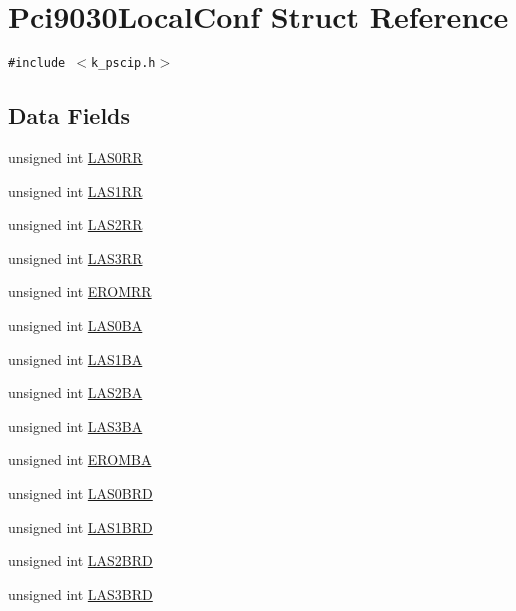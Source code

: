 \hypertarget{struct_pci9030_local_conf}{
\section{Pci9030LocalConf Struct Reference}
\label{struct_pci9030_local_conf}
}
{\tt \#include $<$k\_\-pscip.h$>$}

\subsection*{Data Fields}
\begin{CompactItemize}
\item 
unsigned int \hyperlink{struct_pci9030_local_conf_c27dcf44354ec5809d743275f64a403c}{LAS0RR}
\item 
unsigned int \hyperlink{struct_pci9030_local_conf_64b33e3be91077893cedda99086b9c8c}{LAS1RR}
\item 
unsigned int \hyperlink{struct_pci9030_local_conf_164309e1f88bea53b0348dad8d916914}{LAS2RR}
\item 
unsigned int \hyperlink{struct_pci9030_local_conf_c5aed7b0d70176bee3287582e9b8d3d2}{LAS3RR}
\item 
unsigned int \hyperlink{struct_pci9030_local_conf_640a1160fa5f4af692887dc7f404853a}{EROMRR}
\item 
unsigned int \hyperlink{struct_pci9030_local_conf_6232b249b11127b8a5bf42c615681175}{LAS0BA}
\item 
unsigned int \hyperlink{struct_pci9030_local_conf_f8f6d1e26a4001d9270f3a8c0753024f}{LAS1BA}
\item 
unsigned int \hyperlink{struct_pci9030_local_conf_949a05ceff57440b0ce18bde68b201a6}{LAS2BA}
\item 
unsigned int \hyperlink{struct_pci9030_local_conf_fb520b44e813e57b8d81adf88fcf5d2c}{LAS3BA}
\item 
unsigned int \hyperlink{struct_pci9030_local_conf_aa0b54e90b9f628fc5249c2c82bcddcf}{EROMBA}
\item 
unsigned int \hyperlink{struct_pci9030_local_conf_9fcf5a5a65785075385ab27b763e4be3}{LAS0BRD}
\item 
unsigned int \hyperlink{struct_pci9030_local_conf_ff4f9d2abd8b3d3d4498d76195d28706}{LAS1BRD}
\item 
unsigned int \hyperlink{struct_pci9030_local_conf_759ce80b48bd4c6932afda2b812eecb5}{LAS2BRD}
\item 
unsigned int \hyperlink{struct_pci9030_local_conf_87caab5cc668b36e0a311407c43e7eb7}{LAS3BRD}
\item 

\end{CompactItemize}
